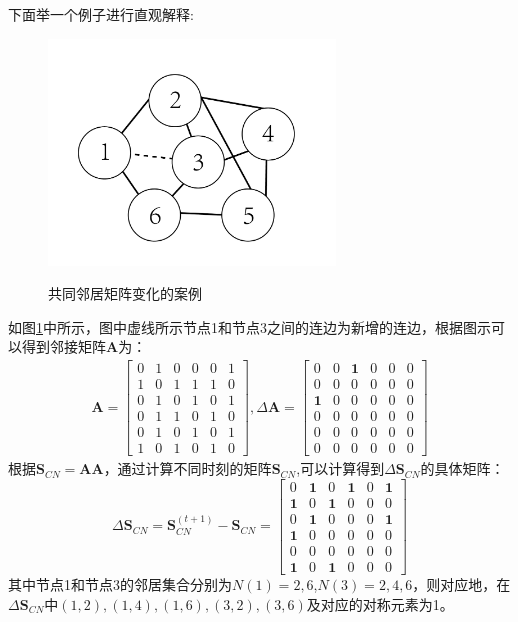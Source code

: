 下面举一个例子进行直观解释:
\begin{figure}[!ht]
	\begin{center}
	{\includegraphics[width=3in]{figures/CN_incremental.png}}
	\caption{共同邻居矩阵变化的案例}
	\label{fig:case_for_lemma}
	\end{center}
\end{figure}
如图\ref{fig:case_for_lemma}中所示，图中虚线所示节点1和节点3之间的连边为新增的连边，根据图示可以得到邻接矩阵$\textbf{A}$为：
\begin{equation}
\begin{matrix}
	\textbf{A} = \begin{bmatrix}
	0&1&0&0&0&1 \\
	1&0&1&1&1&0\\
	0&1&0&1&0&1 \\
	0&1&1&0&1&0\\
	0&1&0&1&0&1\\
	1&0&1&0&1&0
	\end{bmatrix} ,
	\Delta\textbf{A} = \begin{bmatrix}
	0&0&\textbf{1}&0&0&0 \\
	0&0&0&0&0&0\\
	\textbf{1}&0&0&0&0&0 \\
	0&0&0&0&0&0\\
	0&0&0&0&0&0\\
	0&0&0&0&0&0
	\end{bmatrix}
\end{matrix}
\end{equation}
根据$\textbf{S}_{CN} = \textbf{A}\textbf{A}$，通过计算不同时刻的矩阵$\textbf{S}_{CN}$,可以计算得到$\Delta \textbf{S}_{CN}$的具体矩阵：
\begin{equation}
\Delta \textbf{S}_{CN} = \textbf{S}_{CN}^{(t+1)}- \textbf{S}_{CN} = \begin{bmatrix}
0&\textbf{1}&0&\textbf{1}&0&\textbf{1} \\
\textbf{1}&0&\textbf{1}&0&0&0\\
0&\textbf{1}&0&0&0&\textbf{1} \\
\textbf{1}&0&0&0&0&0\\
0&0&0&0&0&0\\
\textbf{1}&0&\textbf{1}&0&0&0
\end{bmatrix}
\end{equation}
其中节点1和节点3的邻居集合分别为$N(1) = {2,6}$,$N(3) = {2,4,6}$，则对应地，在$\Delta \textbf{S}_{CN}$中$(1,2),(1,4),(1,6),(3,2),(3,6)$及对应的对称元素为1。

